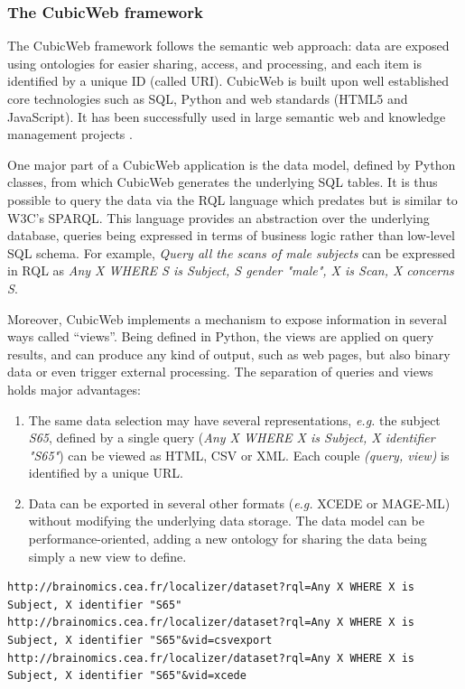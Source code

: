 \documentclass[review]{elsarticle}
\begin{document}
\subsubsection{The CubicWeb framework}
\label{sec:cubicweb}

The CubicWeb framework \cite{CubicWeb} follows the semantic web approach: data are exposed using ontologies for easier sharing, access, and processing, and each item is identified by a unique ID (called URI). CubicWeb is built upon well established core technologies such as SQL, Python and web standards (HTML5 and JavaScript). It has been successfully used in large semantic web and knowledge management projects \cite{Simon2013}.

One major part of a CubicWeb application is the data model, defined by Python classes, from which CubicWeb generates the underlying SQL tables. It is thus possible to query the data via the RQL language which predates but is similar to W3C's SPARQL. This language provides an abstraction over the underlying database, queries being expressed in terms of business logic rather than low-level SQL schema. For example, \emph{Query all the scans of male subjects} can be expressed in RQL as \emph{Any X WHERE S is Subject, S gender "male", X is Scan, X concerns S}.

Moreover, CubicWeb implements a mechanism to expose information in several ways called ``views''. Being defined in Python, the views are applied on query results, and can produce any kind of output, such as web pages, but also binary data or even trigger external processing. The separation of queries and views holds major advantages:
\begin{enumerate}[label=\roman*)]
\item The same data selection may have several representations, \textit{e.g.} the subject \emph{S65}, defined by a single query (\textit{Any X WHERE X is Subject, X identifier "S65"}) can be viewed as HTML, CSV or XML. Each couple \textit{(query, view)} is identified by a unique URL.
\item Data can be exported in several other formats (\textit{e.g.} XCEDE or MAGE-ML) without modifying the underlying data storage. The data model can be performance-oriented, adding a new ontology for sharing the data being simply a new view to define.
\end{enumerate}

\begin{footnotesize}
\begin{lstlisting}
http://brainomics.cea.fr/localizer/dataset?rql=Any X WHERE X is Subject, X identifier "S65"
http://brainomics.cea.fr/localizer/dataset?rql=Any X WHERE X is Subject, X identifier "S65"&vid=csvexport
http://brainomics.cea.fr/localizer/dataset?rql=Any X WHERE X is Subject, X identifier "S65"&vid=xcede
\end{lstlisting}
\end{footnotesize}
\end{document}
